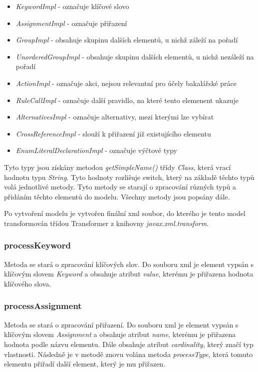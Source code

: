 \begin{itemize}
	\item \textit{KeywordImpl} - označuje klíčové slovo
	\item \textit{AssignmentImpl} - označuje přiřazení
	\item \textit{GroupImpl} - obsahuje skupinu dalších elementů, u nichž záleží na pořadí
	\item \textit{UnorderedGroupImpl} - obsahuje skupinu dalších elementů, u nichž nezáleží na pořadí
	\item \textit{ActionImpl} - označuje akci, nejsou relevantní pro účely bakalářské práce
	\item \textit{RuleCallImpl} - označuje další pravidlo, na které tento elemenent ukazuje
	\item \textit{AlternativesImpl} - označuje alternativy, mezi kterými lze vybírat
	\item \textit{CrossReferenceImpl} - slouží k přiřazení již existujícího elementu
	\item \textit{EnumLiteralDeclarationImpl} - označuje výčtové typy
\end{itemize}

Tyto typy jsou získány metodou \textit{getSimpleName()} třídy \textit{Class}, která vrací hodnotu typu \textit{String}. Tyto hodnoty rozlišuje switch, který na základě těchto typů volá jednotlivé metody. Tyto metody se starají o zpracování různých typů a přidáním těchto elementů do modelu. Všechny metody jsou popsány dále.

Po vytvoření modelu je vytvořen finální xml soubor, do kterého je tento model transformován třídou Transformer z knihovny \textit{javax.xml.transform}.

\subsubsection{processKeyword}
Metoda se stará o zpracování klíčových slov. Do souboru xml je element vypsán s klíčovým slovem \textit{Keyword} a obsahuje atribut \textit{value}, kterému je přiřazena hodnota klíčového slova.
\subsubsection{processAssignment}
Metoda se stará o zpracování přiřazení. Do souboru xml je element vypsán s klíčovým slovem \textit{Assignment} a obsahuje atribut \textit{name}, kterému je přiřazena hodnota podle názvu elementu. Dále obsahuje atribut \textit{cardinality}, který značí typ vlastnosti. Následně je v metodě znovu volána metoda \textit{processType}, která tomuto elementu přiřadí další element, který je mu přiřazen.
